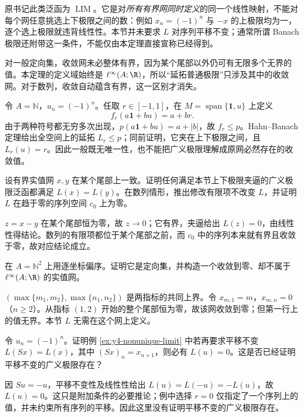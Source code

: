 原书记此类泛函为 $\operatorname{LIM}$。它是对\emph{所有有界网同时定义}的同一个线性映射，不能对每个网任意挑选上下极限之间的数：例如 $x_n=(-1)^n$ 与 $-x$ 的上极限均为一，逐个选上极限就违背线性性。本节并未要求 $L$ 对序列平移不变；通常所谓 Banach 极限还附带这一条件，不能仅由本定理直接宣称已经得到。

对一般定向集，收敛网未必整体有界，因为某个尾部以外仍可有无限多个无界的值。本定理的定义域始终是 $\ell^\infty(A;\R)$，所以“延拓普通极限”只涉及其中的收敛网。对于数列，收敛自动蕴含有界，这一区别才消失。

\begin{example}[同一个振荡序列可以有不同的广义极限]\label{ex:y4-nonunique-limit}
令 $A=\mathbb N$，$u_n=(-1)^n$。任取 $r\in[-1,1]$，在 $M=\operatorname{span}\{\mathbf1,u\}$ 上定义
\[
 f_r(a\mathbf1+bu)=a+br.
\]
由于两种符号都无穷多次出现，$p(a\mathbf1+bu)=a+|b|$，故 $f_r\le p$。Hahn--Banach 定理给出全空间上的延拓 $L_r\le p$；同前证明，它夹在上下极限之间，且 $L_r(u)=r$。因此一般既无唯一性，也不能把广义极限理解成原网必然存在的收敛值。
\end{example}

\begin{exercise}
设有界实值网 $x,y$ 在某个尾部上一致。证明任何满足本节上下极限夹逼的广义极限泛函都满足 $L(x)=L(y)$。在数列情形，推出修改有限项不改变 $L$，并证明 $L$ 在趋于零的序列空间 $c_0$ 上为零。
\end{exercise}
\begin{solution}
$z=x-y$ 在某个尾部恒为零，故 $z\to0$；它有界，夹逼给出 $L(z)=0$，由线性性得结论。数列的有限项都位于某个尾部之前，而 $c_0$ 中的序列本来就有界且收敛于零，故对应结论成立。
\end{solution}

\begin{exercise}
在 $A=\mathbb N^2$ 上用逐坐标偏序。证明它是定向集，并构造一个收敛到零、却不属于 $\ell^\infty(A;\R)$ 的实值网。
\end{exercise}
\begin{solution}
$(\max\{m_1,m_2\},\max\{n_1,n_2\})$ 是两指标的共同上界。令 $x_{m,1}=m$，$x_{m,n}=0$（$n\ge2$）。从指标 $(1,2)$ 开始的整个尾部恒为零，故该网收敛到零；但第一行上的值无界。本节 $L$ 无需在这个网上定义。
\end{solution}

\begin{exercise}
令 $u_n=(-1)^n$。证明例 \ref{ex:y4-nonunique-limit} 中若再要求平移不变 $L(Sx)=L(x)$，其中 $(Sx)_n=x_{n+1}$，则必有 $L(u)=0$。这是否已经证明平移不变的广义极限存在？
\end{exercise}
\begin{solution}
因 $Su=-u$，平移不变性及线性性给出 $L(u)=L(-u)=-L(u)$，故 $L(u)=0$。这只是附加条件的必要推论；例中选择 $r=0$ 仅指定了一个序列上的值，并未约束所有序列的平移。因此这里没有证明平移不变的广义极限存在。
\end{solution}
